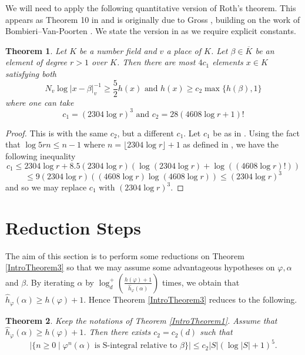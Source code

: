 \documentclass[10pt, reqno]{amsart}
\newcommand{\vphi}{\varphi}
\newcommand{\ovl}{\overline}
\newcommand{\h}{\widehat{h}}
\newtheorem{theorem}{Theorem}
\numberwithin{theorem}{section}
\numberwithin{equation}{section}
\numberwithin{example}{section}
\numberwithin{definition}{section}
\begin{document}
We will need to apply the following quantitative version of Roth's theorem. This appears as Theorem 10 in \cite{HS11} and is originally due to Gross \cite{Gro90}, building on the work of Bombieri--Van-Poorten \cite{BvP88}. We state the version in \cite{Gro90} as we require explicit constants.

\begin{theorem} \label{QuantitativeRoth}
Let $K$ be a number field and $v$ a place of $K$. Let $\beta \in \ovl{K}$ be an element of degree $r > 1$ over $K$. Then there are most $4c_1$ elements $x \in K$ satisfying both
$$N_v \log |x - \beta|^{-1}_v \geq \frac{5}{2} h(x) \text{ and } h(x) \geq c_2 \max\{ h(\beta),1\}$$
where one can take
$$c_1 = (2304  \log r)^3 \text{ and } c_2 = 28 (4608 \log r + 1)!$$
\end{theorem}

\begin{proof}
This is \cite[Corollary]{Gro90} with the same $c_2$, but a different $c_1$. Let $c_1$ be as in \cite[Corollary]{Gro90}. Using the fact that $\log 5rn \leq n-1$ where $n = \lfloor 2304 \log r \rfloor + 1$ as defined in \cite{Gro90},  we have the following inequality
$$c_1 \leq 2304 \log r + 8.5 (2304 \log r) \left( \log (2304 \log r) + \log ((4608 \log r)!) \right)$$ 
$$\leq 9 (2304 \log r) \left(  (4608 \log r) \log (4608 \log r) \right) \leq (2304 \log r)^3$$
and so we may replace $c_1$ with $(2304 \log r)^3$.
\end{proof}





\section{Reduction Steps} \label{sec: Reduction}
The aim of this section is to perform some reductions on Theorem \ref{IntroTheorem3} so that we may assume some advantageous hypotheses on $\vphi,\alpha$ and $\beta$. By iterating $\alpha$ by $\log^+_d(\frac{h(\vphi)+1}{\h_{\vphi}(\alpha)})$ times, we obtain that $\h_{\vphi}(\alpha) \geq h(\vphi)+1$. Hence Theorem \ref{IntroTheorem3} reduces to the following.

\begin{theorem} \label{TheoremReduced1}
Keep the notations of Theorem \ref{IntroTheorem1}. Assume that $\h_{\vphi}(\alpha) \geq h(\vphi)+1$. Then there exists $c_2 = c_2(d)$ such that 
$$|\{ n \geq 0 \mid \vphi^n(\alpha) \text{ is S-integral relative to } \beta\}| \leq c_2 |S| (\log |S|+1)^5.$$
\end{theorem}
\end{document}
